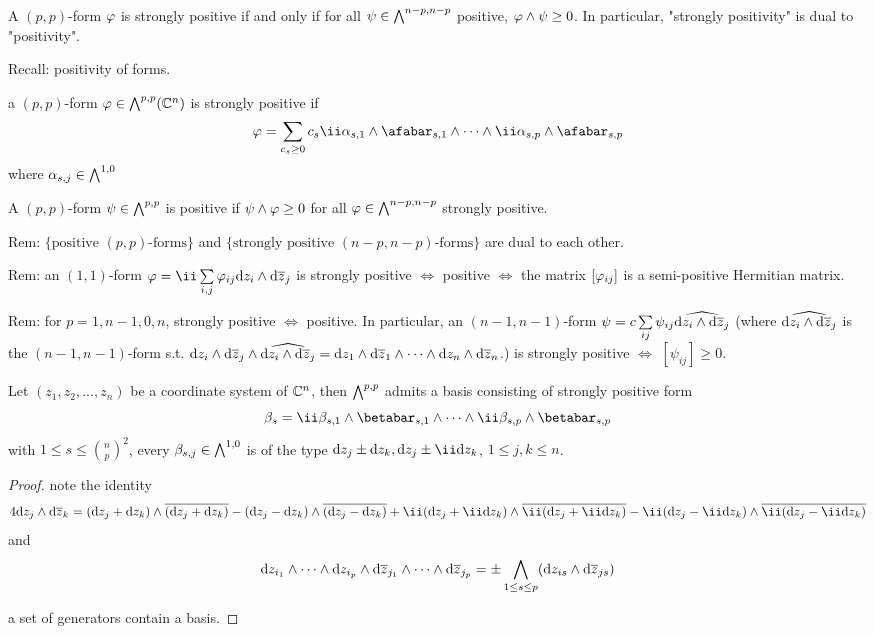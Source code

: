 \begin{cor}
A $(p,p)$-form $\varphi$ is strongly positive if and only if
for all $\psi\in\bigwedge\nolimits^{n-p,n-p}$ positive,
$\varphi\wedge\psi\geq 0$. In particular,
"strongly positivity" is dual to "positivity".
\end{cor}


Recall: positivity of forms.

a $(p,p)$-form $\varphi\in\bigwedge\nolimits^{p,p}(\mathbb{C}^n)$
is strongly positive if
$$
  \fai=\sum_{c_s\geq 0}
    c_s\ii\afa_{s,1}\wedge\afabar_{s,1}
    \wedge\cdots\wedge
    \ii\afa_{s,p}\wedge\afabar_{s,p}
$$
where $\alpha_{s,j}\in\bigwedge\nolimits^{1,0}$

A $(p,p)$-form $\psi\in\bigwedge\nolimits^{p,p}$
is positive if $\psi\wedge\varphi\geq 0$ for all $\varphi\in\bigwedge\nolimits^{n-p,n-p}$
strongly positive.

Rem: $\{\text{positive $(p,p)$-forms}\}$ and
$\{\text{strongly positive $(n-p,n-p)$-forms}\}$
are dual to each other.

Rem: an $(1,1)$-form $\fai=\ii\sum\limits_{i,j}\fai_{ij}\td z_i\wedge\td\zbar_j$
is strongly positive $\iff$ positive $\iff$
the matrix $[\varphi_{ij}]$ is a semi-positive Hermitian matrix.

Rem: for $p=1,n-1,0,n$, strongly positive $\iff$ positive.
In particular, an $(n-1,n-1)$-form
$\psi=c\sum\limits_{ij}\psi_{ij}\widehat{\mathrm{d} z_i\wedge\mathrm{d}\overline{z}_j}$
(where $\widehat{\mathrm{d} z_i\wedge\mathrm{d}\overline{z}_j}$ is the $(n-1,n-1)$-form
s.t. $\mathrm{d} z_i\wedge\mathrm{d} \overline{z}_j\wedge\widehat{\mathrm{d} z_i\wedge\mathrm{d}\overline{z}_j}
=\mathrm{d} z_1\wedge\mathrm{d}\overline{z}_1\wedge\cdots\wedge\mathrm{d} z_n\wedge\mathrm{d}\overline{z}_n$.)
is strongly positive $\iff$ $[\psi_{ij}]\geq 0$.

\begin{prop}
Let $(z_1,z_2,...,z_n)$ be a coordinate system of $\mathbb{C}^n$,
then $\bigwedge\nolimits^{p,p}$ admits a basis consisting of strongly
positive form
$$
  \beta_s
=
  \ii\beta_{s,1}\wedge\betabar_{s,1}
  \wedge\cdots\wedge
  \ii\beta_{s,p}\wedge\betabar_{s,p}
$$
with $1\leq s\leq {n\choose p}^2$, every $\beta_{s,j}\in\bigwedge\nolimits^{1,0}$
is of the type $\td z_j\pm\td z_k, \td z_j\pm\ii\td z_k$,
$1\leq j,k\leq n$.
\end{prop}

\begin{proof}
note the identity
$$
  4\td z_j\wedge\td \zbar_k
=
  (\td z_j+\td z_k)\wedge
  \overline{(\td z_j+\td z_k)}
-
  (\td z_j-\td z_k)\wedge
  \overline{(\td z_j-\td z_k)}
+
  \ii(\td z_j+\ii\td z_k)
  \wedge
  \overline{
    \ii(\td z_j+\ii\td z_k)
  }
-
  \ii(\td z_j-\ii\td z_k)
  \wedge
  \overline{
    \ii(\td z_j-\ii\td z_k)
  }
$$
and
$$
  \mathrm{d} z_{i_1}\wedge\cdots\wedge\mathrm{d} z_{i_p}
\wedge
  \mathrm{d}\overline{z}_{j_1}\wedge\cdots\wedge\mathrm{d}\overline{z}_{j_p}
=
  \pm\bigwedge_{1\leq s\leq p}
  (\mathrm{d} z_{is}\wedge\mathrm{d}\overline{z}_{js})
$$

a set of generators contain a basis.
\end{proof}


